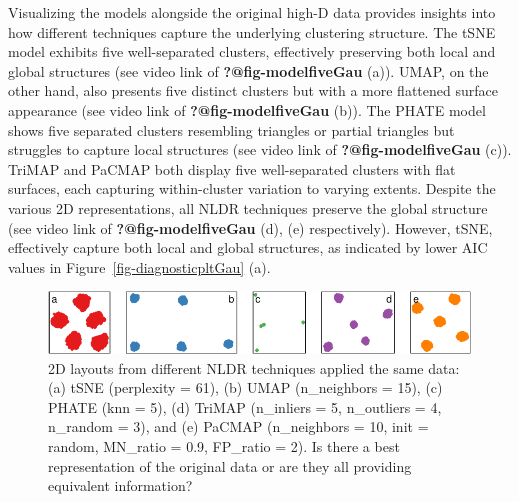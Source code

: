 \documentclass[
  12pt]{article}
\begin{document}
Visualizing the models alongside the original high-D data provides
insights into how different techniques capture the underlying clustering
structure. The tSNE model exhibits five well-separated clusters,
effectively preserving both local and global structures (see video link
of \textbf{?@fig-modelfiveGau} (a)). UMAP, on the other hand, also
presents five distinct clusters but with a more flattened surface
appearance (see video link of \textbf{?@fig-modelfiveGau} (b)). The
PHATE model shows five separated clusters resembling triangles or
partial triangles but struggles to capture local structures (see video
link of \textbf{?@fig-modelfiveGau} (c)). TriMAP and PaCMAP both display
five well-separated clusters with flat surfaces, each capturing
within-cluster variation to varying extents. Despite the various 2D
representations, all NLDR techniques preserve the global structure (see
video link of \textbf{?@fig-modelfiveGau} (d), (e) respectively).
However, tSNE, effectively capture both local and global structures, as
indicated by lower AIC values in Figure~\ref{fig-diagnosticpltGau} (a).

\begin{figure}

{\centering \includegraphics[width=1\textwidth,height=\textheight]{paper_files/figure-pdf/fig-nldervis5Gau-1.pdf}

}

\caption{\label{fig-nldervis5Gau}2D layouts from different NLDR
techniques applied the same data: (a) tSNE (perplexity = 61), (b) UMAP
(n\_neighbors = 15), (c) PHATE (knn = 5), (d) TriMAP (n\_inliers = 5,
n\_outliers = 4, n\_random = 3), and (e) PaCMAP (n\_neighbors = 10, init
= random, MN\_ratio = 0.9, FP\_ratio = 2). Is there a best
representation of the original data or are they all providing equivalent
information?}

\end{figure}
\end{document}
